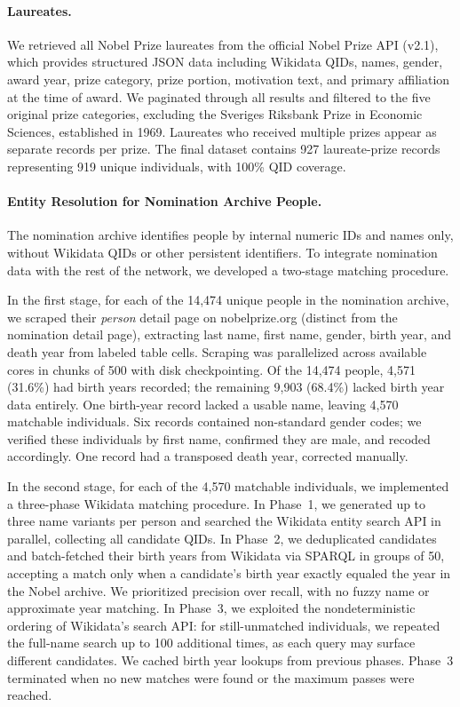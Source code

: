 \documentclass[12pt]{article}
\begin{document}
\paragraph*{Laureates.}

We retrieved all Nobel Prize laureates from the official Nobel Prize API (v2.1), which provides structured JSON data including Wikidata QIDs, names, gender, award year, prize category, prize portion, motivation text, and primary affiliation at the time of award. We paginated through all results and filtered to the five original prize categories, excluding the Sveriges Riksbank Prize in Economic Sciences, established in 1969. Laureates who received multiple prizes appear as separate records per prize. The final dataset contains 927 laureate-prize records representing 919 unique individuals, with 100\% QID coverage.

\paragraph*{Entity Resolution for Nomination Archive People.}

The nomination archive identifies people by internal numeric IDs and names only, without Wikidata QIDs or other persistent identifiers. To integrate nomination data with the rest of the network, we developed a two-stage matching procedure.

In the first stage, for each of the 14,474 unique people in the nomination archive, we scraped their \emph{person} detail page on nobelprize.org (distinct from the nomination detail page), extracting last name, first name, gender, birth year, and death year from labeled table cells. Scraping was parallelized across available cores in chunks of 500 with disk checkpointing. Of the 14,474 people, 4,571 (31.6\%) had birth years recorded; the remaining 9,903 (68.4\%) lacked birth year data entirely. One birth-year record lacked a usable name, leaving 4,570 matchable individuals. Six records contained non-standard gender codes; we verified these individuals by first name, confirmed they are male, and recoded accordingly. One record had a transposed death year, corrected manually.

In the second stage, for each of the 4,570 matchable individuals, we implemented a three-phase Wikidata matching procedure. In Phase~1, we generated up to three name variants per person and searched the Wikidata entity search API in parallel, collecting all candidate QIDs. In Phase~2, we deduplicated candidates and batch-fetched their birth years from Wikidata via SPARQL in groups of 50, accepting a match only when a candidate's birth year exactly equaled the year in the Nobel archive. We prioritized precision over recall, with no fuzzy name or approximate year matching. In Phase~3, we exploited the nondeterministic ordering of Wikidata's search API: for still-unmatched individuals, we repeated the full-name search up to 100 additional times, as each query may surface different candidates. We cached birth year lookups from previous phases. Phase~3 terminated when no new matches were found or the maximum passes were reached.
\end{document}
